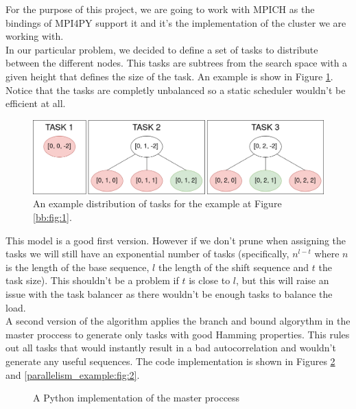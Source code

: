   For the purpose of this project, we are going to work with
  MPICH\cite{mpich} as the bindings of MPI4PY support it and it's
  the implementation of the cluster we are working with\cite{calderon}.\\

  In our particular problem, we decided to define a set of tasks to
  distribute between the different nodes. This tasks are subtrees from the
  search space with a given height that defines the size of the task. An
  example is show in Figure \ref{tasks:fig:1}. Notice that the tasks are
  completly unbalanced so a static scheduler wouldn't be efficient at all.\\


  \begin{figure}[ht!]
    \begin{center}
      \includegraphics[scale=0.4]{Chapters/Implementation/Example_tasks.png}
    \end{center}
    \caption{An example distribution of tasks for the example at Figure
    \ref{bb:fig:1}.}
    \label{tasks:fig:1}
  \end{figure}

  This model is a good first version. However if we don't prune when assigning
  the tasks we will still have an exponential number of tasks (specifically,
  $n^{l-t}$ where $n$ is the length of the base sequence, $l$ the length of
  the shift sequence and $t$ the task size). This shouldn't be a problem if
  $t$ is close to $l$, but this will raise an issue with the task balancer as
  there wouldn't be enough tasks to balance the load.\\

  A second version of the algorithm applies the branch and bound algorythm in
  the master proccess to generate only tasks with good Hamming properties.
  This rules out all tasks that would instantly result in a bad
  autocorrelation and wouldn't generate any useful sequences. The code
  implementation is shown in Figures \ref{parallelism_example:fig:1} and
  \ref{parallelism_example:fig:2}.\\

  \begin{figure}[ht!]
    \caption{A Python implementation of the master proccess}
    \label{parallelism_example:fig:1}
  \end{figure}

